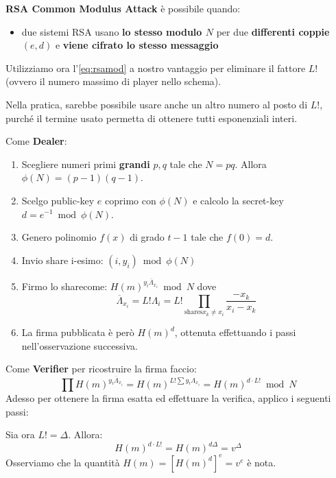 \begin{remark}\textbf{RSA Common Modulus Attack} è possibile quando:
\begin{itemize}
    \item due sistemi RSA usano \textbf{lo stesso modulo $N$} per due \textbf{differenti coppie} $(e,d)$ e \textbf{viene cifrato lo stesso messaggio}
\end{itemize}
\end{remark}
Utilizziamo ora l'\cref{eq:rsamod} a nostro vantaggio per eliminare il fattore $L!$ (ovvero il numero massimo di player nello schema).
\begin{note}
    Nella pratica, sarebbe possibile usare anche un altro numero al posto di $L!$, purché il termine usato permetta di ottenere tutti esponenziali interi.
\end{note}
\begin{definition}\label{def:shouprsa}
Come \textbf{Dealer}:
\begin{enumerate}
    \item Scegliere numeri primi \textbf{grandi} $p,q$ tale che $N=pq$. Allora $\phi(N)=(p-1)(q-1)$.
    \item Scelgo public-key $e$ coprimo con $\phi(N)$ e calcolo la secret-key $d=e^{-1}\bmod\phi(N)$.
    \item Genero polinomio $f(x)$ di grado $t-1$ tale che $f(0)=d$.
    \item Invio share i-esimo: $(i,y_i)\bmod\phi(N)$
    \item Firmo lo share\footnotemark come: $H(m)^{y_i\overline{\Lambda}_{x_i}}\bmod N$ dove
    \[\overline{\Lambda}_{x_i}=L!\Lambda_i=L!\prod_{\text{shares} x_k\ne x_i}\frac{-x_k}{x_i-x_k}\]
    \item La firma pubblicata è però $H(m)^d$, ottenuta effettuando i passi nell'osservazione successiva.
\end{enumerate}
Come \textbf{Verifier} per ricostruire la firma faccio:
\[\prod H(m)^{y_i\overline{\Lambda}_{x_i}}=H(m)^{L!\sum y_i\Lambda_{x_i}}=H(m)^{d\cdot L!}\bmod{N}\]
Adesso per ottenere la firma esatta ed effettuare la verifica, applico i seguenti passi:\\
\begin{remark}
Sia ora $L!=\Delta$. Allora:
\[H(m)^{d\cdot L!}=H(m)^{d\Delta}=v^{\Delta}\]
Osserviamo che la quantità $H(m)=[H(m)^{d}]^e=v^e$ è nota\footnotemark.

\end{remark}
\end{definition}
